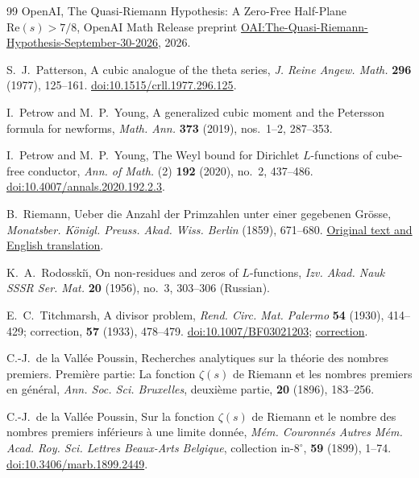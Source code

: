 \documentclass[11pt,a4paper]{article}
\numberwithin{equation}{section}
\numberwithin{figure}{section}
\theoremstyle{definition}
\theoremstyle{remark}
\begin{document}
\begin{thebibliography}{99}
OpenAI,
The Quasi-Riemann Hypothesis: A Zero-Free Half-Plane $\mathrm{Re}(s)>7/8$,
OpenAI Math Release preprint
\href{https://github.com/openai/math/blob/main/preprints/The-Quasi-Riemann-Hypothesis-September-30-2026/paper.pdf}{OAI:The-Quasi-Riemann-Hypothesis-September-30-2026},
2026.

S.~J.~Patterson,
A cubic analogue of the theta series,
\emph{J. Reine Angew. Math.} \textbf{296} (1977), 125--161.
\href{https://doi.org/10.1515/crll.1977.296.125}
{doi:10.1515/crll.1977.296.125}.

I.~Petrow and M.~P.~Young,
A generalized cubic moment and the Petersson formula for newforms,
\emph{Math. Ann.} \textbf{373} (2019), nos.~1--2, 287--353.

I.~Petrow and M.~P.~Young,
The Weyl bound for Dirichlet $L$-functions of cube-free conductor,
\emph{Ann. of Math.} (2) \textbf{192} (2020), no.~2, 437--486.
\href{https://doi.org/10.4007/annals.2020.192.2.3}
{doi:10.4007/annals.2020.192.2.3}.

B.~Riemann,
Ueber die Anzahl der Primzahlen unter einer gegebenen Gr\"osse,
\emph{Monatsber. K\"onigl. Preuss. Akad. Wiss. Berlin}
(1859), 671--680.
\href{https://www.maths.tcd.ie/pub/HistMath/People/Riemann/Zeta/}
{Original text and English translation}.

K.~A.~Rodosski\u{\i},
On non-residues and zeros of $L$-functions,
\emph{Izv. Akad. Nauk SSSR Ser. Mat.} \textbf{20} (1956),
no.~3, 303--306 (Russian).

E.~C.~Titchmarsh,
A divisor problem,
\emph{Rend. Circ. Mat. Palermo} \textbf{54} (1930), 414--429;
correction, \textbf{57} (1933), 478--479.
\href{https://doi.org/10.1007/BF03021203}{doi:10.1007/BF03021203};
\href{https://doi.org/10.1007/BF03017588}{correction}.

C.-J.~de la Vall\'ee Poussin,
Recherches analytiques sur la th\'eorie des nombres premiers.
Premi\`ere partie: La fonction $\zeta(s)$ de Riemann et les
nombres premiers en g\'en\'eral,
\emph{Ann. Soc. Sci. Bruxelles}, deuxi\`eme partie,
\textbf{20} (1896), 183--256.

C.-J.~de la Vall\'ee Poussin,
Sur la fonction $\zeta(s)$ de Riemann et le nombre des nombres
premiers inf\'erieurs \`a une limite donn\'ee,
\emph{M\'em. Couronn\'es Autres M\'em. Acad. Roy. Sci.
Lettres Beaux-Arts Belgique}, collection in-$8^\circ$,
\textbf{59} (1899), 1--74.
\href{https://doi.org/10.3406/marb.1899.2449}
{doi:10.3406/marb.1899.2449}.


\end{thebibliography}
\end{document}
